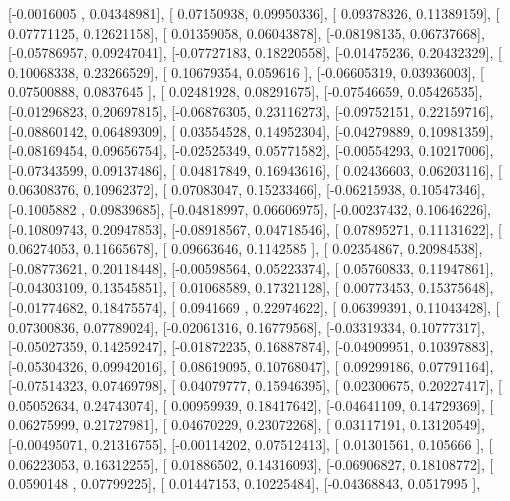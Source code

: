 \documentclass{article}
\begin{document}
       [-0.0016005 ,  0.04348981],
       [ 0.07150938,  0.09950336],
       [ 0.09378326,  0.11389159],
       [ 0.07771125,  0.12621158],
       [ 0.01359058,  0.06043878],
       [-0.08198135,  0.06737668],
       [-0.05786957,  0.09247041],
       [-0.07727183,  0.18220558],
       [-0.01475236,  0.20432329],
       [ 0.10068338,  0.23266529],
       [ 0.10679354,  0.059616  ],
       [-0.06605319,  0.03936003],
       [ 0.07500888,  0.0837645 ],
       [ 0.02481928,  0.08291675],
       [-0.07546659,  0.05426535],
       [-0.01296823,  0.20697815],
       [-0.06876305,  0.23116273],
       [-0.09752151,  0.22159716],
       [-0.08860142,  0.06489309],
       [ 0.03554528,  0.14952304],
       [-0.04279889,  0.10981359],
       [-0.08169454,  0.09656754],
       [-0.02525349,  0.05771582],
       [-0.00554293,  0.10217006],
       [-0.07343599,  0.09137486],
       [ 0.04817849,  0.16943616],
       [ 0.02436603,  0.06203116],
       [ 0.06308376,  0.10962372],
       [ 0.07083047,  0.15233466],
       [-0.06215938,  0.10547346],
       [-0.1005882 ,  0.09839685],
       [-0.04818997,  0.06606975],
       [-0.00237432,  0.10646226],
       [-0.10809743,  0.20947853],
       [-0.08918567,  0.04718546],
       [ 0.07895271,  0.11131622],
       [ 0.06274053,  0.11665678],
       [ 0.09663646,  0.1142585 ],
       [ 0.02354867,  0.20984538],
       [-0.08773621,  0.20118448],
       [-0.00598564,  0.05223374],
       [ 0.05760833,  0.11947861],
       [-0.04303109,  0.13545851],
       [ 0.01068589,  0.17321128],
       [ 0.00773453,  0.15375648],
       [-0.01774682,  0.18475574],
       [ 0.0941669 ,  0.22974622],
       [ 0.06399391,  0.11043428],
       [ 0.07300836,  0.07789024],
       [-0.02061316,  0.16779568],
       [-0.03319334,  0.10777317],
       [-0.05027359,  0.14259247],
       [-0.01872235,  0.16887874],
       [-0.04909951,  0.10397883],
       [-0.05304326,  0.09942016],
       [ 0.08619095,  0.10768047],
       [ 0.09299186,  0.07791164],
       [-0.07514323,  0.07469798],
       [ 0.04079777,  0.15946395],
       [ 0.02300675,  0.20227417],
       [ 0.05052634,  0.24743074],
       [ 0.00959939,  0.18417642],
       [-0.04641109,  0.14729369],
       [ 0.06275999,  0.21727981],
       [ 0.04670229,  0.23072268],
       [ 0.03117191,  0.13120549],
       [-0.00495071,  0.21316755],
       [-0.00114202,  0.07512413],
       [ 0.01301561,  0.105666  ],
       [ 0.06223053,  0.16312255],
       [ 0.01886502,  0.14316093],
       [-0.06906827,  0.18108772],
       [ 0.0590148 ,  0.07799225],
       [ 0.01447153,  0.10225484],
       [-0.04368843,  0.0517995 ],
\end{document}
